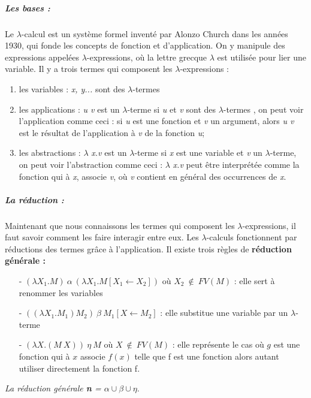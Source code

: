 \documentclass[10pt,a4paper]{article}
\begin{document}
				\subparagraph{Les bases :}
				Le $\lambda$-calcul est un système formel inventé par Alonzo Church dans les années 1930, qui fonde les concepts de fonction et d'application. On y manipule des expressions appelées $\lambda$-expressions, où la lettre grecque $\lambda$ est utilisée pour lier une variable. Il y a trois termes qui composent les $\lambda$-expressions :
				\begin{enumerate}
					\item les variables : \textit{x, y...} sont des $\lambda$-termes 
					\item les applications : \textit{u v} est un $\lambda$-terme si \textit{u} et \textit{v} sont des $\lambda$-termes , on peut voir l'application comme ceci : si \textit{u} est une fonction et \textit{v} un argument, alors \textit{u v} est le résultat de l'application à \textit{v} de la fonction \textit{u}; 
					\item les abstractions : $\lambda$ \textit{x.v} est un $\lambda$-terme si \textit{x} est une variable et \textit{v} un $\lambda$-terme, on peut voir l'abstraction comme ceci : $\lambda$ \textit{x.v} peut être interprétée comme la fonction qui à \textit{x}, associe \textit{v}, où \textit{v} contient en général des occurrences de \textit{x}.
				\end{enumerate}
				\bigbreak
				
				
				\subparagraph{La réduction :}Maintenant que nous connaissons les termes qui composent les $\lambda$-expressions, il faut savoir comment les faire interagir entre eux. Les $\lambda$-calculs fonctionnent par réductions des termes grâce à l'application. Il existe trois règles de \textbf{réduction générale :}
				\begin{itemize}
					\item[-] $(\lambda X_{1}.M)~\alpha~(\lambda X_{1}.M[X_{1} \leftarrow X_{2}])$
					où $X_{2}~\notin~FV(M)$ : elle sert à renommer les variables
					\item[-] $((\lambda X_{1}.M_{1})M_{2})~\beta~M_{1}[X \leftarrow M_{2}]$ : elle substitue une variable par un $\lambda$-terme
    				\item[-] $(\lambda X.(M~X))~\eta~M$ 
					où $X~\notin~FV(M)$ : elle représente le cas où $g$ est une fonction qui à $x$ associe  $f(x)$  telle que f est une fonction alors autant utiliser directement la fonction f.
				\end{itemize}
				\textit{La réduction générale \textbf{n} = $\alpha \cup \beta \cup \eta$}.
				\bigbreak
				
\end{document}
